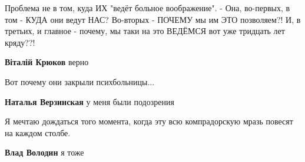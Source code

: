 \begin{itemize}
Проблема не в том, куда ИХ "ведёт больное воображение". - Она, во-первых, в том
- КУДА они ведут НАС? Во-вторых - ПОЧЕМУ мы им ЭТО позволяем?! И, в третьих, и
главное - почему, мы таки на это ВЕДЁМСЯ вот уже тридцать лет кряду??!

\begin{itemize}
 
\textbf{Віталій Крюков} верно
\end{itemize}

 
Вот почему они закрыли психбольницы...

\begin{itemize}
 
\textbf{Наталья Верзинская} у меня были подозрения
\end{itemize}

 
Я мечтаю дождаться того момента, когда эту всю компрадорскую мразь повесят на
каждом столбе.

\begin{itemize}
 
\textbf{Влад Володин} я тоже
\end{itemize}

 

\end{itemize}
